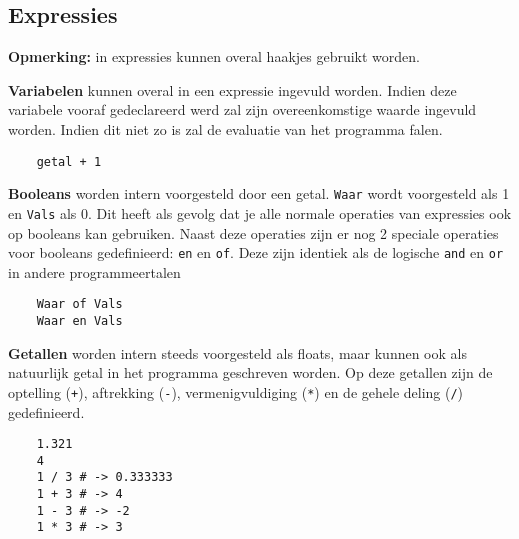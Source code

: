 \documentclass[12pt, titlepage]{article}
\begin{document}
\subsection{Expressies}
\label{sec:expressies}
\begin{description}
\item{\bf Opmerking:} in expressies kunnen overal haakjes gebruikt worden.

\item{\bf Variabelen} kunnen overal in een expressie ingevuld worden. Indien deze variabele vooraf gedeclareerd werd zal zijn overeenkomstige waarde ingevuld worden. Indien dit niet zo is zal de evaluatie van het programma falen.
\newline
\begin{lstlisting}
    getal + 1
\end{lstlisting}

\item{\bf Booleans} worden intern voorgesteld door een getal. \texttt{Waar} wordt voorgesteld als 1 en \texttt{Vals} als 0. Dit heeft als gevolg dat je alle normale operaties van expressies ook op booleans kan gebruiken. Naast deze operaties zijn er nog 2 speciale operaties voor booleans gedefinieerd: \texttt{en} en \texttt{of}. Deze zijn identiek als de logische \texttt{and} en \texttt{or} in andere programmeertalen
\newline
\begin{lstlisting}
    Waar of Vals
    Waar en Vals
\end{lstlisting}

\item{\bf Getallen} worden intern steeds voorgesteld als floats, maar kunnen ook als natuurlijk getal in het programma geschreven worden. Op deze getallen zijn de optelling (\texttt{+}), aftrekking (\texttt{-}), vermenigvuldiging (\texttt{*}) en de gehele deling (\texttt{/}) gedefinieerd.
\newline
\begin{lstlisting}
    1.321
    4
    1 / 3 # -> 0.333333
    1 + 3 # -> 4
    1 - 3 # -> -2
    1 * 3 # -> 3
\end{lstlisting}


\end{description}
\end{document}
